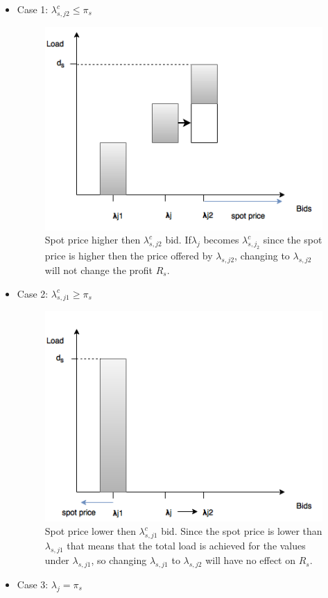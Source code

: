 \documentclass[letterpaper]{article}
\begin{document}
\begin{itemize}
\item Case 1: $\lambda_{s,j2}^c \leq \pi_s$ \\

\begin{figure}[H]
\includegraphics[scale=0.5]{../documentation/p1_c1.png}
\caption{Spot price higher then $\lambda_{s,j2}^c$ bid. If$\lambda_j$ becomes $\lambda^c_{s,j_2}$ since the spot price is higher then the price offered by $\lambda_{s,j2}$, changing to $\lambda_{s,j2}$ will not change the profit $R_s$.}
\end{figure}
\item Case 2: $\lambda_{s,j1}^c \geq \pi_s$ \\

\begin{figure}[H]
\includegraphics[scale=0.5]{../documentation/p1_c2.png}
\caption{Spot price lower then $\lambda_{s,j1}^c$ bid. Since the spot price is lower than $\lambda_{s,j1}$ that means that the total load is achieved for the values under $\lambda_{s,j1}$, so changing $\lambda_{s,j1}$ to $\lambda_{s,j2}$ will have no effect on $R_s$. }
\end{figure}
\item Case 3: $\lambda_j = \pi_s$ \\


\end{itemize}
\end{document}

